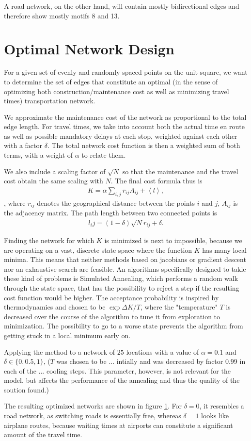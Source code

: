 \documentclass{scrartcl}
\begin{document}
A road network, on the other hand, will contain mostly bidirectional edges and therefore show mostly motifs 8 and 13. 

\section{Optimal Network Design}
For a given set of evenly and randomly spaced points on the unit square, we want to determine the set of edges that constitute an optimal (in the sense of optimizing both construction/maintenance cost as well as minimizing travel times) transportation network.

We approximate the maintenance cost of the network as proportional to the total edge length. For travel times, we take into account both the actual time en route as well as possible mandatory delays at each stop, weighted against each other with a factor $\delta$. The total network cost function is then a weighted sum of both terms, with a weight of $\alpha$ to relate them.  

We also include a scaling factor of $\sqrt{N}$ so that the maintenance and the travel cost obtain the same scaling with $N$. The final cost formula thus is
\begin{align}
 K = \alpha \sum_{i,j} r_{ij} A_{ij} + \left< l \right>,
\end{align}, where $r_{ij}$ denotes the geographical distance between the points $i$ and $j$, $A_{ij}$ is the adjacency matrix.
The path length between two connected points is 
\begin{align}
 l_ij = (1-\delta) \sqrt{N} r_{ij} + \delta.
\end{align}
 
Finding the network for which $K$ is minimized is next to impossible, because we are operating on a vast, discrete state space where the function $K$ has many local minima. This means that neither methods based on jacobians or gradient descent nor an exhaustive search are feasible. 
An algorithms specifically designed to takle these kind of problems is Simulated Annealing, which performs a random walk through the state space, that has the possibility to reject a step if the resulting cost function would be higher. The acceptance probability is inspired by thermodynamics and chosen to be $\exp \Delta K/T$, where the "temperature" $T$ is decreased over the course of the algorithm to tune it from exploration to minimization. The possibility to go to a worse state prevents the algorithm from getting stuck in a local minimum early on.

Applying the method to a network of $25$ locations with a value of $\alpha=0.1$ and $\delta \in \{0, 0.5, 1\}$, ($T$ was chosen to be ... intially and was decreased by factor 0.99 in each of the ... cooling steps. This parameter, however, is not relevant for the model, but affects the performance of the annealing and thus the quality of the soution found.)

The resulting optimized networks are shown in figure \ref{}. For $\delta=0$, it resembles a road network, as switching roads is essentially free, whereas $\delta=1$ looks like airplane routes, because waiting times at airports can constitute a significant amount of the travel time.
\end{document}

